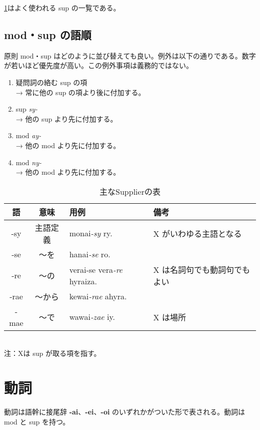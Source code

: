 \cref{table:common-sups}はよく使われる sup の一覧である。

\subsection{mod・sup の語順}

原則 mod・sup はどのように並び替えても良い。例外は以下の通りである。数字が若いほど優先度が高い。この例外事項は義務的ではない。

\begin{enumerate}
    \item 疑問詞の絡む sup の項 \\ → 常に他の sup の項より後に付加する。
    \item sup \emph{sy-} \\ → 他の sup より先に付加する。
    \item mod \emph{ay-} \\ → 他の mod より先に付加する。
    \item mod \emph{ny-} \\ → 他の mod より先に付加する。
\end{enumerate}

\begin{table}[h]
    \centering
    \caption{主なSupplierの表}
    \label{table:common-sups}
    \begin{tabular}{ccll}
        \hline
        語 & 意味 & 用例 & 備考 \\
        \hline \hline
        -sy  & 主語定義 & monai\emph{-sy} ry.             & X がいわゆる主語となる \\
        -se  & ～を & hanai\emph{-se} ro.                 & \\
        -re  & ～の & verai-se vera\emph{-re} hyraiza.   & X は名詞句でも動詞句でもよい \\
        -rae & ～から & kewai\emph{-rae} ahyra.            & \\
        -mae & ～で & wawai\emph{-zae} iy.                 & X は場所 \\
        \hline
    \end{tabular}
    \\ 注：Xは sup が取る項を指す。
\end{table}

\section{動詞}

動詞は語幹に接尾辞 \textbf{-ai}、\textbf{-ei}、\textbf{-oi} のいずれかがついた形で表される。動詞は mod と sup を持つ。

